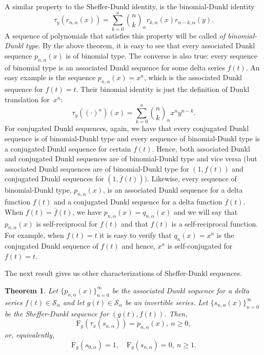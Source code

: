 \documentclass[11pt]{article}
\theoremstyle{plain}
\newtheorem{theorem}{Theorem}[section]
\theoremstyle{remark}
\numberwithin{equation}{section} %
\newcommand{\binoma}[2]{\binom{#1}{#2}_{\!\alpha}}
\newcommand{\Sa}{\mathcal{S}_{\alpha}}
\newcommand{\FF}{\mathrm{F}}
\begin{document}
A similar property to the Sheffer-Dunkl identity, is the binomial-Dunkl identity
\begin{equation*}
\tau_y(r_{n,\alpha}(x)) = \sum_{k=0}^{n} \binoma{n}{k} r_{k,\alpha}(x) r_{n-k,\alpha}(y).
\end{equation*}
A sequence of polynomials that satisfies this property will be called \textit{of binomial-Dunkl type}. By the above theorem, it is easy to see that every associated Dunkl sequence $p_{n,\alpha}(x)$ is of binomial type. The converse is also true: every sequence of binomial type is an associated Dunkl sequence for some delta series $f(t)$. An easy example is the sequence $p_{n,\alpha}(x) = x^n$, which is the associated Dunkl sequence for $f(t) = t$. Their binomial identity is just the definition of Dunkl translation for~$x^n$:
\[
\tau_y((\cdot)^n)(x) = \sum_{k=0}^{n} \binoma{n}{k} x^n y^{n-k}.
\]
For conjugated Dunkl sequences, again,  we have that every conjugated Dunkl sequence is of binomial-Dunkl type and every sequence of binomial-Dunkl type is a conjugated Dunkl sequence for certain $f(t)$. Hence, both associated Dunkl and conjugated Dunkl sequences are of binomial-Dunkl type and vice versa (but associated Dunkl sequences are of binomial-Dunkl type for $(1,f(t))$ and conjugated Dunkl sequences for $(1,\overline{f}(t)))$. Likewise, every sequence of binomial-Dunkl type, $p_{n,\alpha}(x)$, is an associated Dunkl sequence for a delta function $f(t)$ and a conjugated Dunkl sequence for a delta function $\overline{f}(t)$. When $f(t) = \overline{f}(t)$, we have $p_{n,\alpha}(x) = q_{n,\alpha}(x)$ and we will say that $p_{n,\alpha}(x)$ is self-reciprocal for $f(t)$ and that $f(t)$ is a self-reciprocal function. For example, when $f(t) = t$ it is easy to verify that $q_n(x) = x^n$ is the conjugated Dunkl sequence of $f(t)$ and hence, $x^n$ is self-conjugated for $f(t) = t$.

The next result gives us other characterizations of Sheffer-Dunkl sequences. 

\begin{theorem}
\label{thm:main}
Let $\{p_{n,\alpha}(x)\}_{n=0}^{\infty}$ be the associated Dunkl sequence for a delta series $f(t) \in \Sa$ and let $g(t) \in \Sa$ be an invertible series. Let $\{s_{n,\alpha}(x)\}_{n=0}^{\infty}$ be the  Sheffer-Dunkl sequence for $(g(t),f(t))$. Then, 
\begin{equation}
\label{eq:func2}
\FF_g(\tau_{x}(s_{n,\alpha})) = p_{n,\alpha}(x),\ n\ge 0,
\end{equation}
or, equivalently,
\begin{equation}
\label{eq:func1}
\FF_g(s_{0,\alpha}) = 1,\quad \FF_g(s_{n,\alpha}) = 0,\ n\ge 1.
\end{equation}
\end{theorem}
\end{document}
